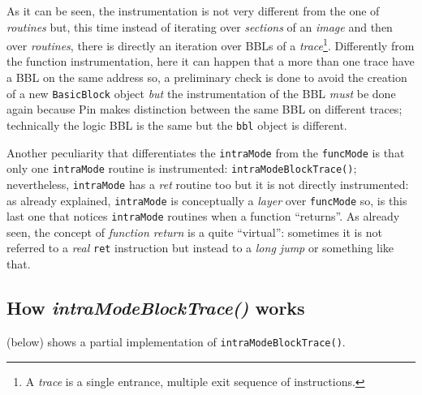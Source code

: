 \documentclass[a4paper,10pt]{report}
\begin{document}
\noindent
As it can be seen, the instrumentation is not very different from the one
of \emph{routines} but, this time instead of iterating over \emph{sections} of an \emph{image} and then over \emph{routines},
there is directly an iteration over BBLs of a
\emph{trace}\footnote{A \emph{trace} is a single entrance, multiple exit sequence of instructions.}. Differently from the function instrumentation, here it can happen
that a more than one trace have a BBL on the same address so,
a preliminary check is done to avoid the creation of
a new \verb|BasicBlock| object \emph{but} the instrumentation of the BBL \emph{must}
be done again because Pin makes distinction between the same BBL on different traces;
technically the logic BBL is the same but the \verb|bbl| object is different.

Another peculiarity that differentiates the \verb|intraMode| from
 the \verb|funcMode| is that only one \verb|intraMode| routine is instrumented:
\verb|intraModeBlockTrace()|; nevertheless, \verb|intraMode| has a \emph{ret} routine
too but it is not directly instrumented: as already explained,
\verb|intraMode| is conceptually a \emph{layer} over \verb|funcMode| so,
is this last one that notices \verb|intraMode| routines when a function ``returns''.
As already seen, the concept of \emph{function return} is a quite ``virtual'':
sometimes it is not referred to a \emph{real} \verb|ret| instruction
but instead to a \emph{long jump} or something like that.

\subsection{How \emph{intraModeBlockTrace()} works}

 (below) shows a partial
implementation of \verb|intraModeBlockTrace()|.
\end{document}
